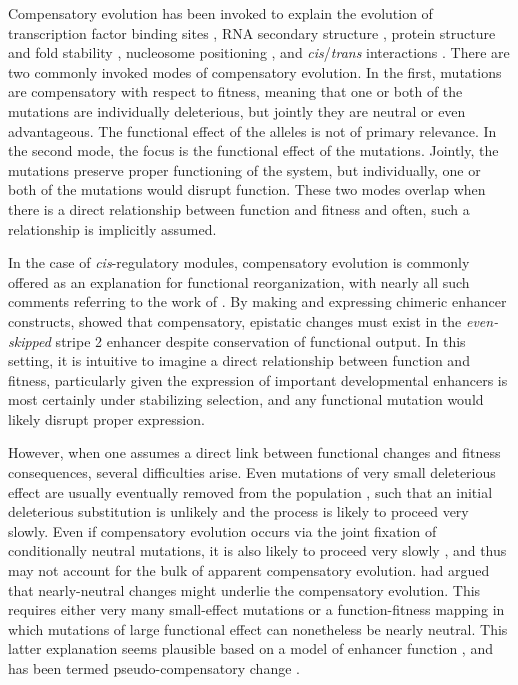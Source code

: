 \documentclass[dvips,12pt,twoside,titlepage]{article}
\begin{document}
Compensatory evolution has been invoked to explain the evolution of transcription factor binding sites \cite{Gibson:1996hx,Moses:2006p2892,Ludwig:2000p3921,Lusk2010}, RNA secondary structure \cite{Stephan:1996wl,Chen:1999vn,Ancel:2000p5969}, protein structure and fold stability \cite{DePristo:2005jc,Callahan:2011bk}, nucleosome positioning \cite{Kenigsberg:2010je}, and \emph{cis}/\emph{trans} interactions \cite{Landry:2005kr,Tuch:2008p1599,Kuo:2010fk}.
There are two commonly invoked modes of compensatory evolution. 
In the first, mutations are compensatory with respect to fitness, meaning that one or both of the mutations are individually deleterious, but jointly they are neutral or even advantageous. The functional effect of the alleles is not of primary relevance. 
In the second mode, the focus is the functional effect of the mutations. Jointly, the mutations preserve proper functioning of the system, but individually, one or both of the mutations would disrupt function. 
These two modes overlap when there is a direct relationship between function and fitness and often, such a relationship is implicitly assumed. 

In the case of \emph{cis}-regulatory modules, compensatory evolution is commonly offered as an explanation for functional reorganization, with nearly all such comments referring to the work of . 
By making and expressing chimeric enhancer constructs,  showed that compensatory, epistatic changes must exist in the \emph{even-skipped} stripe 2 enhancer despite conservation of functional output. 
In this setting, it is intuitive to imagine a direct relationship between function and fitness, particularly given the expression of important developmental enhancers is most certainly under stabilizing selection, and any functional mutation would likely disrupt proper expression. 

However, when one assumes a direct link between functional changes and fitness consequences, several difficulties arise.
Even mutations of very small deleterious effect are usually eventually removed from the population \cite{Ewens:2004fj}, such that an initial deleterious substitution is unlikely and the process is likely to proceed very slowly. 
Even if compensatory evolution occurs via the joint fixation of conditionally neutral mutations, it is also likely to proceed very slowly \cite{Kimura:1985p1185,Stephan:1996wl,Iwasa:2004p1017,Durrett:2008p984}, and thus may not account for the bulk of apparent compensatory evolution. 
 had argued that nearly-neutral changes might underlie the compensatory evolution. 
This requires either very many small-effect mutations or a function-fitness mapping in which mutations of large functional effect can nonetheless be nearly neutral. This latter explanation seems plausible based on a model of enhancer function \cite{Bullaughey:2011cf}, and has been termed pseudo-compensatory change \cite{Haag:2007fu}.
\end{document}
